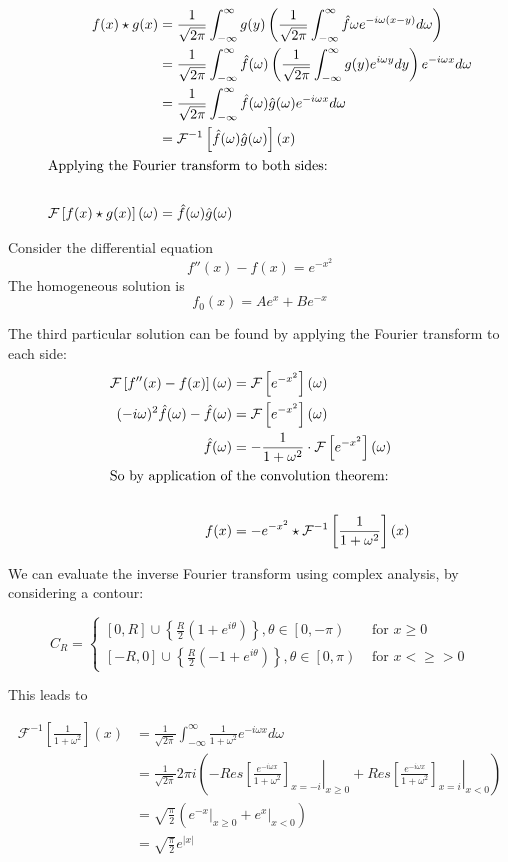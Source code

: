 \documentclass{physics_notes}
\newcommand{\intfty}{\int_{-\infty}^\infty}
\newcommand{\F}[2]{\mathcal{F}\left[#1\right](#2)}
\renewcommand{\Finv}[2]{\mathcal{F}^{-1}\left[#1\right](#2)}
\newcommand{\intF}[3]{\frac{1}{\sqrt{2\pi}}\intfty #1 e^{i#3#2}d#2}
\newcommand{\intFinv}[3]{\frac{1}{\sqrt{2\pi}}\intfty #1 e^{-i#3#2}d#3}
\begin{document}
\begin{align*}
f(x) \star g(x) &= \frac{1}{\sqrt{2\pi}} \intfty g(y) \left(\intFinv{\hat{f}{\omega}}{(x-y)}{\omega}\right) \\
&= \intFinv{\hat{f}(\omega) \left(\intF{g(y)}{y}{\omega}\right)}{x}{\omega} \\
&= \intFinv{\hat{f}(\omega)\hat{g}(\omega)}{x}{\omega} \\
&= \Finv{\hat{f}(\omega)\hat{g}(\omega)}{x} \\
\intertext{Applying the Fourier transform to both sides:} \\
\F{f(x) \star g(x)}{\omega} &= \hat{f}(\omega)\hat{g}(\omega)
\end{align*}

\begin{example}{}
Consider the differential equation \[f''(x) - f(x) = e^{-x^2}\] The homogeneous solution is \[f_0(x) = Ae^x + Be^{-x}\]

The third particular solution can be found by applying the Fourier transform to each side:
\begin{align*}
\F{f''(x) - f(x)}{\omega} &= \F{e^{-x^2}}{\omega} \\
(-i\omega)^2\hat{f}(\omega) - \hat{f}(\omega) &= \F{e^{-x^2}}{\omega} \\
\hat{f}(\omega) &= -\frac{1}{1+\omega^2}\cdot\F{e^{-x^2}}{\omega} \\
\intertext{So by application of the convolution theorem:} \\
f(x) &= -e^{-x^2} \star \Finv{\frac{1}{1+\omega^2}}{x}
\end{align*}

We can evaluate the inverse Fourier transform using complex analysis, by considering a contour:

\begin{equation*}
C_R = \begin{cases}[0,R]\cup\left\{\frac{R}{2}\left(1 + e^{i\theta}\right)\right\},\theta\in\left[0,-\pi\right) & \text{ for } x \geq 0 \\ [-R,0]\cup\left\{\frac{R}{2}\left(-1 + e^{i\theta}\right)\right\},\theta\in\left[0,\pi\right) & \text{ for } x <\geq> 0 \end{cases}
\end{equation*}

This leads to

\begin{align*}
\Finv{\frac{1}{1+\omega^2}}{x} &= \intFinv{\frac{1}{1+\omega^2}}{x}{\omega} \\
&= \frac{1}{\sqrt{2\pi}} 2\pi i\left(\left.-Res\left[\frac{e^{-i\omega x}}{1+\omega^2}\right]_{x=-i}\right|_{x\geq 0} + \left.Res\left[\frac{e^{-i\omega x}}{1+\omega^2}\right]_{x=i}\right|_{x < 0} \right) \\
&= \sqrt{\frac{\pi}{2}}\left(\left.e^{-x}\right|_{x\geq 0} + \left. e^x\right|_{x<0}\right) \\
&= \sqrt{\frac{\pi}{2}}e^{|x|}
\end{align*}


\end{example}
\end{document}
